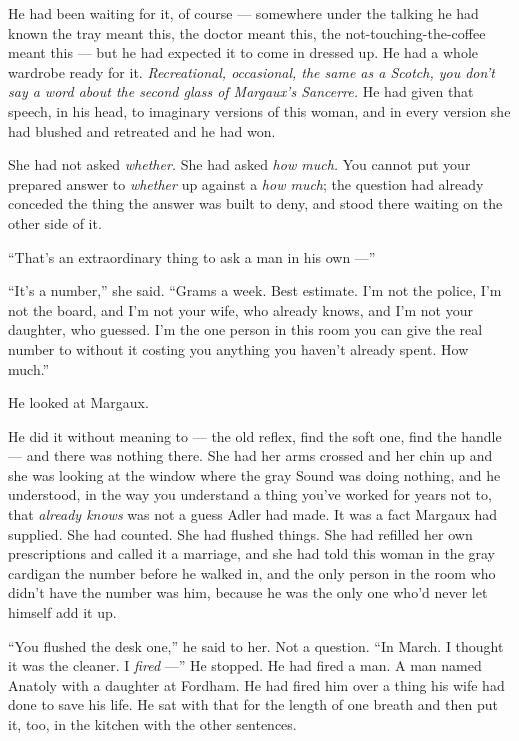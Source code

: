 \documentclass[11pt,openany]{book}
\newcommand{\scenebreak}{\par\vspace{0.5\baselineskip}\begin{center}\textasteriskcentered\quad\textasteriskcentered\quad\textasteriskcentered\end{center}\vspace{0.5\baselineskip}\par}
\begin{document}
He had been waiting for it, of course --- somewhere under the talking he had known the tray meant this, the doctor meant this, the not-touching-the-coffee meant this --- but he had expected it to come in dressed up. He had a whole wardrobe ready for it. \textit{Recreational, occasional, the same as a Scotch, you don't say a word about the second glass of Margaux's Sancerre.} He had given that speech, in his head, to imaginary versions of this woman, and in every version she had blushed and retreated and he had won.

She had not asked \textit{whether.} She had asked \textit{how much.} You cannot put your prepared answer to \textit{whether} up against a \textit{how much}; the question had already conceded the thing the answer was built to deny, and stood there waiting on the other side of it.

``That's an extraordinary thing to ask a man in his own ---''

``It's a number,'' she said. ``Grams a week. Best estimate. I'm not the police, I'm not the board, and I'm not your wife, who already knows, and I'm not your daughter, who guessed. I'm the one person in this room you can give the real number to without it costing you anything you haven't already spent. How much.''


\scenebreak


He looked at Margaux.

He did it without meaning to --- the old reflex, find the soft one, find the handle --- and there was nothing there. She had her arms crossed and her chin up and she was looking at the window where the gray Sound was doing nothing, and he understood, in the way you understand a thing you've worked for years not to, that \textit{already knows} was not a guess Adler had made. It was a fact Margaux had supplied. She had counted. She had flushed things. She had refilled her own prescriptions and called it a marriage, and she had told this woman in the gray cardigan the number before he walked in, and the only person in the room who didn't have the number was him, because he was the only one who'd never let himself add it up.

``You flushed the desk one,'' he said to her. Not a question. ``In March. I thought it was the cleaner. I \textit{fired} ---'' He stopped. He had fired a man. A man named Anatoly with a daughter at Fordham. He had fired him over a thing his wife had done to save his life. He sat with that for the length of one breath and then put it, too, in the kitchen with the other sentences.
\end{document}
